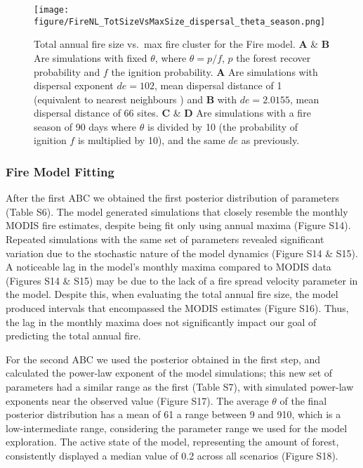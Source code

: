 \documentclass[
]{article}
\begin{document}
\begin{figure}
\centering
\texttt{[image: figure/FireNL\_TotSizeVsMaxSize\_dispersal\_theta\_season.png]}
\caption{Total annual fire size vs.~max fire cluster for the Fire model.
\textbf{A} \& \textbf{B} Are simulations with fixed \(\theta\), where
\(\theta = p/f\), \(p\) the forest recover probability and \(f\) the
ignition probability. \textbf{A} Are simulations with dispersal exponent
\(de=102\), mean dispersal distance of 1 (equivalent to nearest
neighbours ) and \textbf{B} with \(de=2.0155\), mean dispersal distance
of 66 sites. \textbf{C} \& \textbf{D} Are simulations with a fire season
of 90 days where \(\theta\) is divided by 10 (the probability of
ignition \(f\) is multiplied by 10), and the same \(de\) as previously.}
\end{figure}

\subsubsection{Fire Model Fitting}\label{fire-model-fitting-1}

After the first ABC we obtained the first posterior distribution of
parameters (Table S6). The model generated simulations that closely
resemble the monthly MODIS fire estimates, despite being fit only using
annual maxima (Figure S14). Repeated simulations with the same set of
parameters revealed significant variation due to the stochastic nature
of the model dynamics (Figure S14 \& S15). A noticeable lag in the
model's monthly maxima compared to MODIS data (Figures S14 \& S15) may
be due to the lack of a fire spread velocity parameter in the model.
Despite this, when evaluating the total annual fire size, the model
produced intervals that encompassed the MODIS estimates (Figure S16).
Thus, the lag in the monthly maxima does not significantly impact our
goal of predicting the total annual fire.

For the second ABC we used the posterior obtained in the first step, and
calculated the power-law exponent of the model simulations; this new set
of parameters had a similar range as the first (Table S7), with
simulated power-law exponents near the observed value (Figure S17). The
average \(\theta\) of the final posterior distribution has a mean of 61
a range between 9 and 910, which is a low-intermediate range,
considering the parameter range we used for the model exploration. The
active state of the model, representing the amount of forest,
consistently displayed a median value of 0.2 across all scenarios
(Figure S18).
\end{document}
